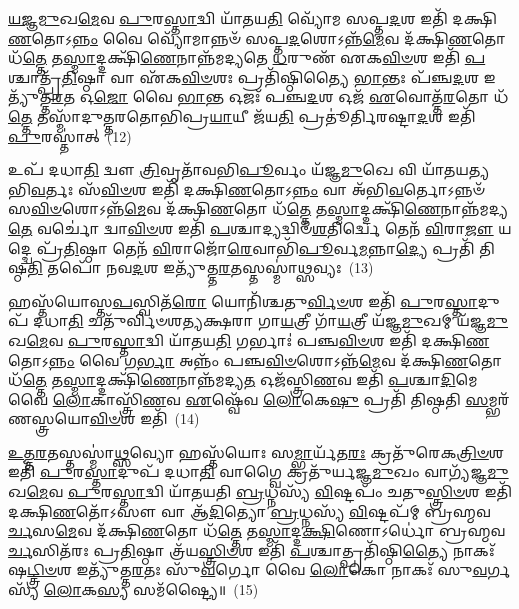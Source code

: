 \-\ul{𑌯}\-\-\ul{𑌜𑍍𑌞}\-\-\ul{𑌮𑍁}\-𑌖\-\ul{𑌮𑍇}\-𑌵 \ul{𑌪𑍁}\-𑌰\-\ul{𑌸𑍍𑌤𑌾}\-𑌦𑍍𑌵𑌿 𑌯𑌾᳴𑌤𑌯\-\ul{𑌤𑌿} 𑌵𑍍𑌯𑍋᳴𑌮 𑌸𑌪𑍍𑌤\-\ul{𑌦}\-𑌶 𑌇𑌤𑌿᳴ 𑌦𑌕𑍍𑌷𑌿\-\ul{𑌣}\-𑌤𑍋\-𑌽\-\ul{𑌨𑍍𑌨𑌂} 𑌵𑍈 𑌵𑍍𑌯𑍋᳴𑌮𑌾𑌨𑍍𑌨𑍞᳴ 𑌸𑌪𑍍𑌤\-\ul{𑌦}\-𑌶𑍋\-𑌽𑌨𑍍𑌨᳴\-\ul{𑌮𑍇}\-𑌵 𑌦᳴𑌕𑍍𑌷𑌿\-\ul{𑌣}\-𑌤𑍋 𑌧᳴\-\ul{𑌤𑍍𑌤𑍇} 𑌤\-\ul{𑌸𑍍𑌮𑌾}\-𑌦𑍍𑌦𑌕𑍍𑌷𑌿᳴\-\ul{𑌣𑍇}\-𑌨𑌾𑌨𑍍𑌨᳴𑌮𑌦𑍍𑌯𑌤𑍇 \ul{𑌧}\-𑌰𑍁𑌣᳴ 𑌏𑌕\-\ul{𑌵𑌿}\-\-\ul{𑍞}\-𑌶 𑌇𑌤𑌿᳴ \ul{𑌪}\-𑌶𑍍𑌚𑌾𑌤𑍍𑌪𑍍𑌰᳴\-\ul{𑌤𑌿}\-𑌷𑍍𑌠𑌾 𑌵𑌾 𑌏᳴𑌕\-\ul{𑌵𑌿}\-\-\ul{𑍞}\-𑌶𑌃 𑌪𑍍𑌰𑌤𑌿᳴𑌷𑍍𑌠𑌿𑌤𑍍𑌯𑍈 \ul{𑌭𑌾}\-𑌨𑍍𑌤𑌃 𑌪᳴𑌞𑍍𑌚\-\ul{𑌦}\-𑌶 𑌇𑌤𑍍𑌯𑍁᳴𑌤𑍍𑌤\-\ul{𑌰}\-𑌤 𑌓\-\ul{𑌜𑍋} 𑌵𑍈 \ul{𑌭𑌾}\-𑌨𑍍𑌤 𑌓𑌜𑌃᳴ 𑌪𑌞𑍍𑌚\-\ul{𑌦}\-𑌶 𑌓𑌜᳴ \ul{𑌏}\-𑌵𑍋𑌤𑍍𑌤᳴\-\ul{𑌰}\-𑌤𑍋 𑌧᳴\-\ul{𑌤𑍍𑌤𑍇} 𑌤𑌸𑍍𑌮𑌾᳴𑌦𑍁𑌤𑍍𑌤𑌰𑌤𑍋𑌭𑌿𑌪𑍍𑌰\-\ul{𑌯𑌾}\-𑌯𑍀 𑌜᳴𑌯\-\ul{𑌤𑌿} 𑌪𑍍𑌰𑌤𑍂॑𑌰𑍍𑌤𑌿𑌰𑌷𑍍𑌟𑌾\-\ul{𑌦}\-𑌶 𑌇𑌤𑌿᳴ \ul{𑌪𑍁}\-𑌰𑌸𑍍𑌤𑌾॑𑌤𑍍~(12)

𑌉𑌪᳴ 𑌦𑌧𑌾\-\ul{𑌤𑌿} 𑌦𑍍𑌵𑍗 \ul{𑌤𑍍𑌰𑌿}\-𑌵𑍃𑌤𑌾᳴𑌵𑌭𑌿\-\ul{𑌪𑍂}\-𑌰𑍍𑌵𑌂 𑌯᳴𑌜𑍍𑌞\-\ul{𑌮𑍁}\-𑌖𑍇 𑌵𑌿 𑌯𑌾᳴𑌤𑌯𑌤𑍍𑌯𑌭𑌿\-\ul{𑌵}\-𑌰𑍍𑌤𑌃 𑌸᳴\-\ul{𑌵𑌿}\-\-\ul{𑍞}\-𑌶 𑌇𑌤𑌿᳴ 𑌦𑌕𑍍𑌷𑌿\-\ul{𑌣}\-𑌤𑍋\-𑌽\-\ul{𑌨𑍍𑌨𑌂} 𑌵𑌾 𑌅᳴𑌭𑌿\-\ul{𑌵}\-𑌰𑍍𑌤𑍋\-𑌽𑌨𑍍𑌨𑍞᳴ 𑌸\-\ul{𑌵𑌿}\-\-\ul{𑍞}\-𑌶𑍋\-𑌽𑌨𑍍𑌨᳴\-\ul{𑌮𑍇}\-𑌵 𑌦᳴𑌕𑍍𑌷𑌿\-\ul{𑌣}\-𑌤𑍋 𑌧᳴\-\ul{𑌤𑍍𑌤𑍇} 𑌤\-\ul{𑌸𑍍𑌮𑌾}\-𑌦𑍍𑌦𑌕𑍍𑌷𑌿᳴\-\ul{𑌣𑍇}\-𑌨𑌾𑌨𑍍𑌨᳴𑌮𑌦𑍍𑌯\-\ul{𑌤𑍇} 𑌵𑌰𑍍𑌚𑍋॑ 𑌦𑍍𑌵𑌾\-\ul{𑌵𑌿}\-\-\ul{𑍞}\-𑌶 𑌇𑌤𑌿᳴ \ul{𑌪}\-𑌶𑍍𑌚𑌾𑌦𑍍𑌯𑌦𑍍𑌵𑌿𑍞᳴\-\ul{𑌶}\-𑌤𑌿𑌰𑍍𑌦𑍍𑌵𑍇 𑌤𑍇𑌨᳴ \ul{𑌵𑌿}\-𑌰𑌾\-\ul{𑌜𑍗} 𑌯𑌦𑍍𑌦𑍍𑌵𑍇 𑌪𑍍𑌰᳴\-\ul{𑌤𑌿}\-𑌷𑍍𑌠𑌾 𑌤𑍇𑌨᳴ \ul{𑌵𑌿}\-𑌰𑌾𑌜𑍋᳴\-\ul{𑌰𑍇}\-𑌵𑌾𑌭𑌿᳴\-\ul{𑌪𑍂}\-𑌰𑍍𑌵\-\ul{𑌮}\-𑌨𑍍𑌨𑌾\-\ul{𑌦𑍍𑌯𑍇} 𑌪𑍍𑌰𑌤𑌿᳴ 𑌤𑌿𑌷𑍍𑌠\-\ul{𑌤𑌿} 𑌤𑌪𑍋᳴ 𑌨𑌵\-\ul{𑌦}\-𑌶 𑌇𑌤𑍍𑌯𑍁᳴𑌤𑍍𑌤\-\ul{𑌰}\-𑌤𑌸𑍍𑌤𑌸𑍍𑌮𑌾॑\-\ul{𑌥𑍍𑌸}\-𑌵𑍍𑌯𑌃~(13)

𑌹𑌸𑍍𑌤᳴𑌯𑍋𑌸𑍍𑌤\-\ul{𑌪}\-𑌸𑍍𑌵𑌿𑌤᳴\-\ul{𑌰𑍋} 𑌯𑍋𑌨𑌿᳴𑌶𑍍𑌚𑌤𑍁\-\ul{𑌰𑍍𑌵𑌿}\-\-\ul{𑍞}\-𑌶 𑌇𑌤𑌿᳴ \ul{𑌪𑍁}\-𑌰\-\ul{𑌸𑍍𑌤𑌾}\-𑌦𑍁𑌪᳴ 𑌦𑌧𑌾\-\ul{𑌤𑌿} 𑌚𑌤𑍁᳴𑌰𑍍𑌵𑌿𑍞𑌶𑌤𑍍𑌯𑌕𑍍𑌷𑌰𑌾 𑌗𑌾\-\ul{𑌯}\-𑌤𑍍𑌰𑍀 𑌗𑌾᳴\-\ul{𑌯}\-𑌤𑍍𑌰𑍀 𑌯᳴𑌜𑍍𑌞\-\ul{𑌮𑍁}\-𑌖𑌮𑍍 𑌯᳴𑌜𑍍𑌞\-\ul{𑌮𑍁}\-𑌖\-\ul{𑌮𑍇}\-𑌵 \ul{𑌪𑍁}\-𑌰\-\ul{𑌸𑍍𑌤𑌾}\-𑌦𑍍𑌵𑌿 𑌯𑌾᳴𑌤𑌯\-\ul{𑌤𑌿} 𑌗𑌰𑍍𑌭𑌾𑌃॑ 𑌪𑌞𑍍𑌚\-\ul{𑌵𑌿}\-\-\ul{𑍞}\-𑌶 𑌇𑌤𑌿᳴ 𑌦𑌕𑍍𑌷𑌿\-\ul{𑌣}\-𑌤𑍋\-𑌽\-\ul{𑌨𑍍𑌨𑌂} 𑌵𑍈 𑌗\-\ul{𑌰𑍍𑌭𑌾} 𑌅𑌨𑍍𑌨𑌂᳴ 𑌪𑌞𑍍𑌚\-\ul{𑌵𑌿}\-\-\ul{𑍞}\-𑌶𑍋\-𑌽𑌨𑍍𑌨᳴\-\ul{𑌮𑍇}\-𑌵 𑌦᳴𑌕𑍍𑌷𑌿\-\ul{𑌣}\-𑌤𑍋 𑌧᳴\-\ul{𑌤𑍍𑌤𑍇} 𑌤\-\ul{𑌸𑍍𑌮𑌾}\-𑌦𑍍𑌦𑌕𑍍𑌷𑌿᳴\-\ul{𑌣𑍇}\-𑌨𑌾𑌨𑍍𑌨᳴𑌮𑌦𑍍𑌯\-\ul{𑌤} 𑌓𑌜᳴𑌸𑍍𑌤𑍍𑌰𑌿\-\ul{𑌣}\-𑌵 𑌇𑌤𑌿᳴ \ul{𑌪}\-𑌶𑍍𑌚𑌾\-\ul{𑌦𑌿}\-𑌮𑍇 𑌵𑍈 \ul{𑌲𑍋}\-𑌕𑌾𑌸𑍍𑌤𑍍𑌰𑌿᳴\-\ul{𑌣}\-𑌵 \ul{𑌏}\-𑌷𑍍𑌵𑍇᳴𑌵 \ul{𑌲𑍋}\-𑌕𑍇\-\ul{𑌷𑍁} 𑌪𑍍𑌰𑌤𑌿᳴ 𑌤𑌿𑌷𑍍𑌠𑌤𑌿 \ul{𑌸}\-𑌮𑍍𑌭𑌰᳴𑌣𑌸𑍍𑌤𑍍𑌰𑌯𑍋\-\ul{𑌵𑌿}\-\-\ul{𑍞}\-𑌶 𑌇𑌤𑌿᳴~(14)

\-\ul{𑌉}\-\-\ul{𑌤𑍍𑌤}\-\-\ul{𑌰}\-𑌤𑌸𑍍𑌤𑌸𑍍𑌮𑌾॑\-\ul{𑌥𑍍𑌸}\-𑌵𑍍𑌯𑍋 𑌹𑌸𑍍𑌤᳴𑌯𑍋𑌃 𑌸\-\ul{𑌮𑍍𑌭𑌾}\-𑌰𑍍𑌯᳴𑌤\-\ul{𑌰𑌃} 𑌕𑍍𑌰𑌤𑍁᳴𑌰𑍇𑌕\-\ul{𑌤𑍍𑌰𑌿}\-\-\ul{𑍞}\-𑌶 𑌇𑌤𑌿᳴ \ul{𑌪𑍁}\-𑌰\-\ul{𑌸𑍍𑌤𑌾}\-𑌦𑍁𑌪᳴ 𑌦𑌧𑌾\-\ul{𑌤𑌿} 𑌵𑌾𑌗𑍍𑌵𑍈 𑌕𑍍𑌰𑌤𑍁᳴𑌰𑍍𑌯𑌜𑍍𑌞\-\ul{𑌮𑍁}\-𑌖𑌂 𑌵𑌾𑌗𑍍𑌯᳴𑌜𑍍𑌞\-\ul{𑌮𑍁}\-𑌖\-\ul{𑌮𑍇}\-𑌵 \ul{𑌪𑍁}\-𑌰\-\ul{𑌸𑍍𑌤𑌾}\-𑌦𑍍𑌵𑌿 𑌯𑌾᳴𑌤𑌯𑌤𑌿 \ul{𑌬𑍍𑌰}\-𑌧𑍍𑌨𑌸𑍍𑌯᳴ \ul{𑌵𑌿}\-𑌷𑍍𑌟𑌪𑌂᳴ 𑌚𑌤𑍁\-\ul{𑌸𑍍𑌤𑍍𑌰𑌿}\-\-\ul{𑍞}\-𑌶 𑌇𑌤𑌿᳴ 𑌦𑌕𑍍𑌷𑌿\-\ul{𑌣}\-𑌤𑍋᳴\-𑌽𑌸𑍗 𑌵𑌾 𑌆᳴\-\ul{𑌦𑌿}\-𑌤𑍍𑌯𑍋 \ul{𑌬𑍍𑌰}\-𑌧𑍍𑌨𑌸𑍍𑌯᳴ \ul{𑌵𑌿}\-𑌷𑍍𑌟𑌪᳴𑌮𑍍 𑌬𑍍𑌰𑌹𑍍𑌮𑌵\-\ul{𑌰𑍍𑌚}\-𑌸\-\ul{𑌮𑍇}\-𑌵 𑌦᳴𑌕𑍍𑌷𑌿\-\ul{𑌣}\-𑌤𑍋 𑌧᳴\-\ul{𑌤𑍍𑌤𑍇} 𑌤\-\ul{𑌸𑍍𑌮𑌾}\-𑌦𑍍𑌦\-\ul{𑌕𑍍𑌷𑌿}\-𑌣𑍋\-𑌽𑌰𑍍𑌧𑍋॑ 𑌬𑍍𑌰𑌹𑍍𑌮𑌵\-\ul{𑌰𑍍𑌚}\-𑌸𑌿𑌤᳴𑌰𑌃 𑌪𑍍𑌰\-\ul{𑌤𑌿}\-𑌷𑍍𑌠𑌾 𑌤𑍍𑌰᳴𑌯\-\ul{𑌸𑍍𑌤𑍍𑌰𑌿}\-\-\ul{𑍞}\-𑌶 𑌇𑌤𑌿᳴ \ul{𑌪}\-𑌶𑍍𑌚𑌾𑌤𑍍𑌪𑍍𑌰𑌤𑌿᳴𑌷𑍍𑌠𑌿\-\ul{𑌤𑍍𑌯𑍈} 𑌨𑌾𑌕𑌃᳴ 𑌷\-\ul{𑌟𑍍𑌤𑍍𑌰𑌿}\-\-\ul{𑍞}\-𑌶 𑌇𑌤𑍍𑌯𑍁᳴𑌤𑍍𑌤\-\ul{𑌰}\-𑌤𑌃 𑌸𑍁᳴\-\ul{𑌵}\-𑌰𑍍𑌗𑍋 𑌵𑍈 \ul{𑌲𑍋}\-𑌕𑍋 𑌨𑌾𑌕𑌃᳴ 𑌸𑍁\-\ul{𑌵}\-𑌰𑍍𑌗𑌸𑍍𑌯᳴ \ul{𑌲𑍋}\-𑌕\-\ul{𑌸𑍍𑌯} 𑌸𑌮᳴𑌷𑍍𑌟𑍍𑌯𑍈॥~(15)

